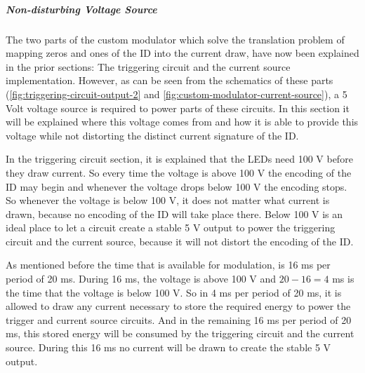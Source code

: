 




\subparagraph{Non-disturbing Voltage Source}

		
	The two parts of the custom modulator which solve the translation problem of mapping zeros and ones of the ID into the current draw, have now been explained in the prior sections: The triggering circuit and the current source implementation.
	However, as can be seen from the schematics of these parts (\autoref{fig:triggering-circuit-output-2} and \autoref{fig:custom-modulator-current-source}), a 5 Volt voltage source is required to power parts of these circuits.
	In this section it will be explained where this voltage comes from and how it is able to provide this voltage while not distorting the distinct current signature of the ID.


	In the triggering circuit section, it is explained that the LEDs need 100 V before they draw current.
	So every time the voltage is above 100 V the encoding of the ID may begin and whenever the voltage drops below 100 V the encoding stops.
	So whenever the voltage is below 100 V, it does not matter what current is drawn, because no encoding of the ID will take place there.
	Below 100 V is an ideal place to let a circuit create a stable 5 V output to power the triggering circuit and the current source, because it will not distort the encoding of the ID.

	As mentioned before the time that is available for modulation, is 16 ms per period of 20 ms.
	During 16 ms, the voltage is above 100 V and $20 - 16 = 4$ ms is the time that the voltage is below 100 V.
	So in 4 ms per period of 20 ms, it is allowed to draw any current necessary to store the required energy to power the trigger and current source circuits.
	And in the remaining 16 ms per period of 20 ms, this stored energy will be consumed by the triggering circuit and the current source.
	During this 16 ms no current will be drawn to create the stable 5 V output.%

